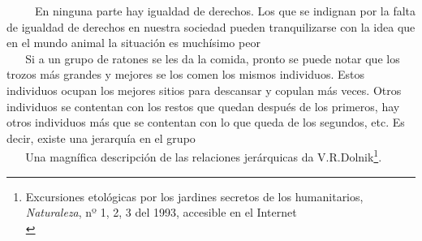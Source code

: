 ~ ~ ~ En ninguna parte hay igualdad de derechos. Los que se indignan por
la falta de igualdad de derechos en nuestra sociedad pueden
tranquilizarse con la idea que en el mundo animal la situación es
muchísimo peor\\
\hspace*{0.333em} ~ ~ Si a un grupo de ratones se les da la comida,
pronto se puede notar que los trozos más grandes y mejores se los comen
los mismos individuos. Estos individuos ocupan los mejores sitios para
descansar y copulan más veces. Otros individuos se contentan con los
restos que quedan después de los primeros, hay otros individuos más que
se contentan con lo que queda de los segundos, etc. Es decir, existe una
jerarquía en el grupo\\
\hspace*{0.333em} ~ ~ Una magnífica descripción de las relaciones
jerárquicas da V.R.Dolnik\footnote{Excursiones etológicas por los
  jardines secretos de los humanitarios, \emph{Naturaleza}, nº 1, 2, 3
  del 1993, accesible en el Internet\\}.

